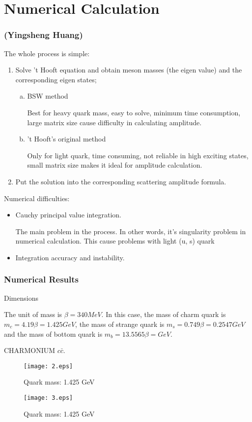 \documentclass[8pt]{beamer}
\begin{document}
\section{Numerical Calculation}
\begin{frame}
	\frametitle{\insertsectionhead (Yingsheng Huang)}
	The whole process is simple:
	\begin{enumerate}
		\item Solve 't Hooft equation and obtain meson masses (the eigen value) and the corresponding eigen states;
		      \begin{enumerate}[(a)]
			      \item BSW method

			            Best for heavy quark mass, easy to solve, minimum time consumption, large matrix size cause difficulty in calculating amplitude.
			      \item 't Hooft's original method

			            Only for light quark, time consuming, not reliable in high exciting states, small matrix size makes it ideal for amplitude calculation.
		      \end{enumerate}
		\item Put the solution into the corresponding scattering amplitude formula.
	\end{enumerate}
	Numerical difficulties:
	\begin{itemize}
		\item Cauchy principal value integration.

		      The main problem in the process. In other words, it's singularity problem in numerical calculation. This cause problems with light (u, s) quark
		\item Integration accuracy and instability.
	\end{itemize}
\end{frame}

\begin{frame}
	\frametitle{Numerical Results}
	Dimensions

	The unit of mass is $\beta=340MeV$. In this case, the mass of charm quark is $m_c=4.19\beta=1.425GeV$, the mass of strange quark is $m_s=0.749\beta=0.2547GeV$ and the mass of bottom quark is $m_b=13.5565\beta=  GeV$.

	CHARMONIUM	$c\bar c$.



	\begin{minipage}{0.49\linewidth}
		\begin{figure}[H]
			\centering
			\texttt{[image: 2.eps]}
			\caption{Quark mass: 1.425 GeV}
			\label{fig:ccbar2}
		\end{figure}
	\end{minipage}
	\begin{minipage}{0.49\linewidth}
		\begin{figure}[H]
			\centering
			\texttt{[image: 3.eps]}
			\caption{Quark mass: 1.425 GeV}
			\label{fig:ccbar3}
		\end{figure}
	\end{minipage}

\end{frame}
\end{document}
